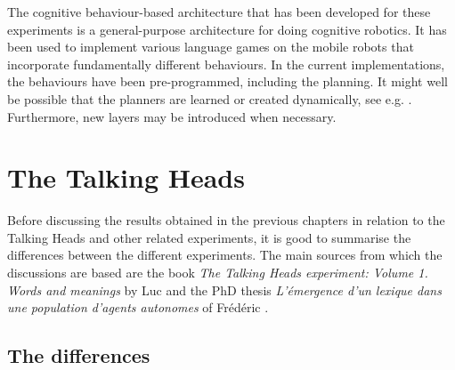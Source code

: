 The cognitive behaviour-based architecture that has been developed for these experiments is a general-purpose architecture for doing cognitive robotics. It has been used to implement various language games on the mobile robots that incorporate fundamentally different behaviours. In the current implementations, the behaviours have been pre-programmed, including the planning. It might well be possible that the planners are learned or created dynamically, see e.g. \citet{barnesetal:1997}. Furthermore, new layers may be introduced when necessary.


\section{The Talking Heads}\label{s:disc:th}

Before discussing the results obtained in the previous chapters in relation to the Talking Heads and other related experiments, it is good to summarise the differences between the different experiments. The main sources from which the discussions are based are the book {\em The Talking Heads experiment: Volume 1. Words and meanings} by Luc \citet{steels:2000} and the PhD thesis {\em L'\'emergence d'un lexique dans une population d'agents autonomes} of Fr\'ed\'eric \citet{kaplan:2000}.

\subsection{The differences}

